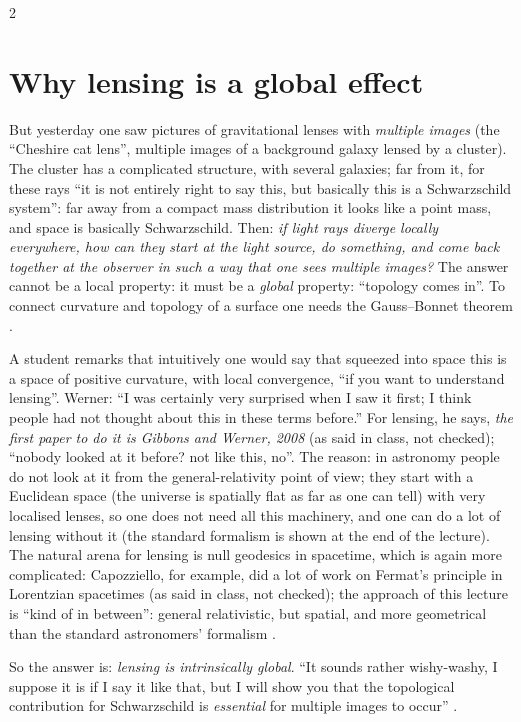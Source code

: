 \begin{paracol}{2}
\section{Why lensing is a global effect}\label{sec:c17-global}

But yesterday one saw pictures of gravitational lenses with \emph{multiple images} (the ``Cheshire cat lens'', multiple images of a background galaxy lensed by a cluster). The cluster has a complicated structure, with several galaxies; far from it, for these rays ``it is not entirely right to say this, but basically this is a Schwarzschild system'': far away from a compact mass distribution it looks like a point mass, and space is basically Schwarzschild. Then: \emph{if light rays diverge locally everywhere, how can they start at the light source, do something, and come back together at the observer in such a way that one sees multiple images?} The answer cannot be a local property: it must be a \emph{global} property: ``topology comes in''. To connect curvature and topology of a surface one needs the Gauss--Bonnet theorem .
\begin{coursenote}
A student remarks that intuitively one would say that squeezed into space this is a space of positive curvature, with local convergence, ``if you want to understand lensing''. Werner: ``I was certainly very surprised when I saw it first; I think people had not thought about this in these terms before.'' For lensing, he says, \emph{the first paper to do it is Gibbons and Werner, 2008} (as said in class, not checked); ``nobody looked at it before? not like this, no''. The reason: in astronomy people do not look at it from the general-relativity point of view; they start with a Euclidean space (the universe is spatially flat as far as one can tell) with very localised lenses, so one does not need all this machinery, and one can do a lot of lensing without it (the standard formalism is shown at the end of the lecture). The natural arena for lensing is null geodesics in spacetime, which is again more complicated: Capozziello, for example, did a lot of work on Fermat's principle in Lorentzian spacetimes (as said in class, not checked); the approach of this lecture is ``kind of in between'': general relativistic, but spatial, and more geometrical than the standard astronomers' formalism .
\end{coursenote}
So the answer is: \emph{lensing is intrinsically global}. ``It sounds rather wishy-washy, I suppose it is if I say it like that, but I will show you that the topological contribution for Schwarzschild is \emph{essential} for multiple images to occur'' .


\end{paracol}
